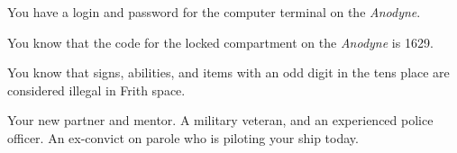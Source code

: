 \documentclass[char]{guildcamp4}
\begin{document}
\begin{itemz}[Notes]
	\item You have a login and password for the computer terminal on the \emph{Anodyne}.
	\item You know that the code for the locked compartment on the \emph{Anodyne} is 1629.
	\item You know that signs, abilities, and items with an odd digit in the tens place are considered illegal in Frith space.
\end{itemz}

\begin{contacts}
	\contact{\cCbad{}} Your new partner and mentor. A military veteran, and an experienced police officer.
	\contact{\cPilot{}}	An ex-convict on parole who is piloting your ship today.
\end{contacts}
\end{document}
